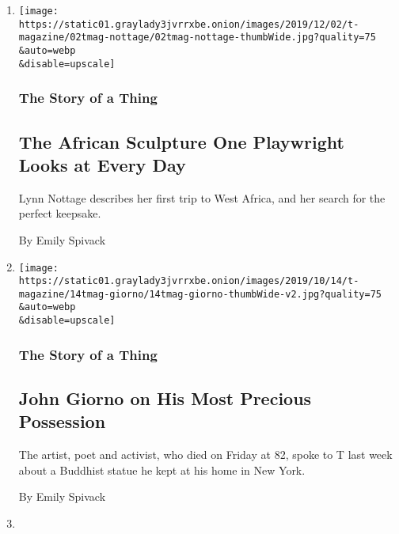 \begin{enumerate}
\def\labelenumi{\arabic{enumi}.}
\item
  \href{/2019/12/03/t-magazine/lynn-nottage-ekoi-sculpture.html}{}

  \texttt{[image: https://static01.graylady3jvrrxbe.onion/images/2019/12/02/t-magazine/02tmag-nottage/02tmag-nottage-thumbWide.jpg?quality=75\\\&auto=webp\\\&disable=upscale]}

  \hypertarget{the-story-of-a-thing}{%
  \subsubsection{The Story of a Thing}\label{the-story-of-a-thing}}

  \hypertarget{the-african-sculpture-one-playwright-looks-at-every-day}{%
  \subsection{The African Sculpture One Playwright Looks at Every
  Day}\label{the-african-sculpture-one-playwright-looks-at-every-day}}

  Lynn Nottage describes her first trip to West Africa, and her search
  for the perfect keepsake.

  By Emily Spivack
\item
  \href{/2019/10/14/t-magazine/john-giorno-buddhism.html}{}

  \texttt{[image: https://static01.graylady3jvrrxbe.onion/images/2019/10/14/t-magazine/14tmag-giorno/14tmag-giorno-thumbWide-v2.jpg?quality=75\\\&auto=webp\\\&disable=upscale]}

  \hypertarget{the-story-of-a-thing-1}{%
  \subsubsection{The Story of a Thing}\label{the-story-of-a-thing-1}}

  \hypertarget{john-giorno-on-his-most-precious-possession}{%
  \subsection{John Giorno on His Most Precious
  Possession}\label{john-giorno-on-his-most-precious-possession}}

  The artist, poet and activist, who died on Friday at 82, spoke to T
  last week about a Buddhist statue he kept at his home in New York.

  By Emily Spivack
\item
  \href{/2019/09/24/t-magazine/whoopi-goldberg-unqualified-hostess.html}{}


\end{enumerate}
